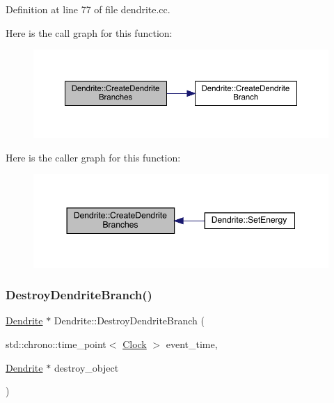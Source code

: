 Definition at line 77 of file dendrite.\+cc.

Here is the call graph for this function\+:
\nopagebreak
\begin{figure}[H]
\begin{center}
\leavevmode
\includegraphics[width=350pt]{class_dendrite_a812b9cd99ae7d81023bfa25c8f563e96_cgraph}
\end{center}
\end{figure}
Here is the caller graph for this function\+:
\nopagebreak
\begin{figure}[H]
\begin{center}
\leavevmode
\includegraphics[width=350pt]{class_dendrite_a812b9cd99ae7d81023bfa25c8f563e96_icgraph}
\end{center}
\end{figure}
\mbox{\label{class_dendrite_a87887a43ac38e762255da18eaaee43f5}} 
\subsubsection{\texorpdfstring{Destroy\+Dendrite\+Branch()}{DestroyDendriteBranch()}}
{\footnotesize\ttfamily \hyperlink{class_dendrite}{Dendrite} $\ast$ Dendrite\+::\+Destroy\+Dendrite\+Branch (\begin{DoxyParamCaption}\item[{std\+::chrono\+::time\+\_\+point$<$ \hyperlink{universe_8h_a0ef8d951d1ca5ab3cfaf7ab4c7a6fd80}{Clock} $>$}]{event\+\_\+time,  }\item[{\hyperlink{class_dendrite}{Dendrite} $\ast$}]{destroy\+\_\+object }\end{DoxyParamCaption})}



